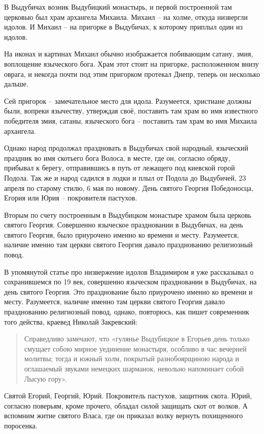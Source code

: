 \documentclass[a5paper,11pt,openany]{article}
\begin{document}
   В Выдубичах возник Выдубицкий монастырь, и первой построенной там церковью был храм архангела Михаила. Михаил – на холме, откуда низвергли идолов. И Михаил – на пригорке в Выдубичах, к которому приплыл один из идолов.
 
   На иконах и картинах Михаил обычно изображается побивающим сатану, змия, воплощение языческого бога. Храм этот стоит на пригорке, расположенном внизу оврага, и некогда почти под этим пригорком протекал Днепр, теперь он несколько дальше.

  Сей пригорок – замечательное место для идола. Разумеется, христиане должны были, вопреки язычеству, утверждая своё, поставить там храм во имя известного победителя змия, сатаны, языческого бога – поставить там храм во имя Михаила архангела.

    Однако народ продолжал праздновать в Выдубичах свой народный, языческий праздник  во имя скотьего бога Волоса, в месте, где он, согласно обряду, прибывал к берегу, отправившись в путь от лежащего под киевской горой Подола. Так же и народ садился в лодки и плыл от Подола до Выдубичей, 23 апреля по старому стилю, 6 мая по новому. День святого Георгия Победоносца, Егория или Юрия – покровителя пастухов. 

   Вторым по счету построенным в Выдубицком монастыре храмом была церковь святого Георгия. Совершенно языческое праздновании в Выдубичах, на день святого Георгия, было приурочено именно ко времени и месту. Разумеется, наличие именно там церкви святого Георгия давало празднованию религиозный повод.

В упомянутой статье про низвержение идолов Владимиром я уже рассказывал о сохранившемся по 19 век, совершенно языческом праздновании в Выдубичах, на день святого Георгия. Это празднование было приурочено именно ко времени и месту. Разумеется, наличие именно там церкви святого Георгия давало празднованию религиозный повод, однако, повторюсь, как пишет современник того действа, краевед Николай Закревский\cite{zakr01}:

\begin{quotation}
\noindent Справедливо замечают, что «гулянье Выдубицкое в Егорьев день только смущает собою мирное уединение монастыря, особливо в час вечерней молитвы; тогда и южный холм, покрытый разнобоярщиною народа и оглашаемый звуками немецких шарманок, невольно напоминает собой Лысую гору».\end{quotation}

  Святой Егорий, Георгий, Юрий.  Покровитель пастухов, защитник скота. Юрий, согласно поверьям, кроме прочего, обладал силой защищать скот от волков. А вспомним житие святого Власа, где он приказал волку вернуть похищенного поросенка.
\end{document}
